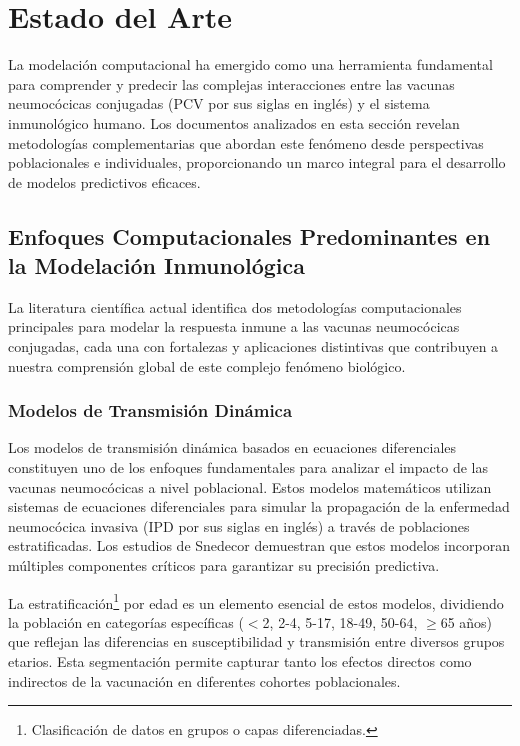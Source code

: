  
\chapter{Estado del Arte}\label{chapter:estadoarte}

La modelación computacional ha emergido como una herramienta fundamental para comprender y predecir las complejas interacciones entre las vacunas neumocócicas conjugadas (PCV por sus siglas en inglés) y el sistema inmunológico humano. Los documentos analizados en esta sección revelan metodologías complementarias que abordan este fenómeno desde perspectivas poblacionales e individuales, proporcionando un marco integral para el desarrollo de modelos predictivos eficaces.

\section{Enfoques Computacionales Predominantes en la Modelación Inmunológica}

La literatura científica actual identifica dos metodologías computacionales principales para modelar la respuesta inmune a las vacunas neumocócicas conjugadas, cada una con fortalezas y aplicaciones distintivas que contribuyen a nuestra comprensión global de este complejo fenómeno biológico.

\subsection{Modelos de Transmisión Dinámica}

Los modelos de transmisión dinámica basados en ecuaciones diferenciales constituyen uno de los enfoques fundamentales para analizar el impacto de las vacunas neumocócicas a nivel poblacional. Estos modelos matemáticos utilizan sistemas de ecuaciones diferenciales para simular la propagación de la enfermedad neumocócica invasiva (IPD por sus siglas en inglés) a través de poblaciones estratificadas. Los estudios de Snedecor \cite{Snedecor2020a,Snedecor2020b} demuestran que estos modelos incorporan múltiples componentes críticos para garantizar su precisión predictiva.

La estratificación\footnote{Clasificación de datos en grupos o capas diferenciadas.} por edad es un elemento esencial de estos modelos, dividiendo la población en categorías específicas ($<$2, 2-4, 5-17, 18-49, 50-64, $\geq$65 años) que reflejan las diferencias en susceptibilidad y transmisión entre diversos grupos etarios. Esta segmentación permite capturar tanto los efectos directos como indirectos de la vacunación en diferentes cohortes poblacionales.

